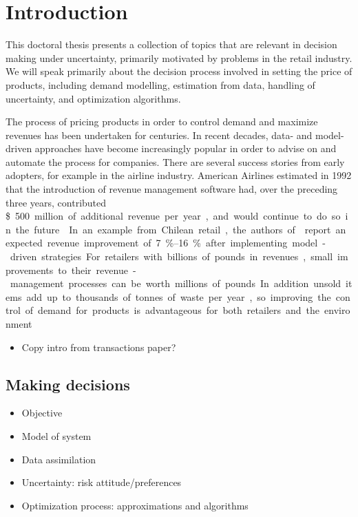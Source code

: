 \documentclass[main.tex]{subfiles}
\begin{document}
\chapter{Introduction}
This doctoral thesis presents a collection of topics that are relevant
in decision making under uncertainty, primarily motivated by
problems in the retail industry.
We will speak primarily about the decision process involved in setting the
price of products, including demand modelling, estimation from data,
handling of uncertainty, and optimization algorithms.

The process of pricing products in order to control demand and
maximize revenues has been undertaken for centuries. In recent
decades, data- and model-driven approaches have become increasingly
popular in order to advise on and automate the process for companies.
There are several success stories from early adopters, for example in
the airline industry.
American Airlines estimated in 1992 that the introduction of revenue
management software had, over the preceding three
years, contributed \SI{500}[\$] million of additional revenue per year,
and would continue to do so in the future~\cite{smith1992yield}.
In an example from Chilean retail, the authors of~\cite{bitran1998coordinating}
report an expected revenue improvement of \SIrange{7}{16}{\percent} after implementing
model-driven strategies.
For retailers with billions of pounds in revenues, small
improvements to their revenue-management processes can be worth millions
of pounds.
In addition unsold items add up to thousands of tonnes of waste per year, so
improving the control of demand for products is advantageous
for both retailers and the environment.


\begin{itemize}
\item Copy intro from transactions paper?
\end{itemize}

\section{Making decisions}

\begin{itemize}
\item Objective
\item Model of system
\item Data assimilation
\item Uncertainty: risk attitude/preferences
\item Optimization process: approximations and algorithms
\end{itemize}
\end{document}
